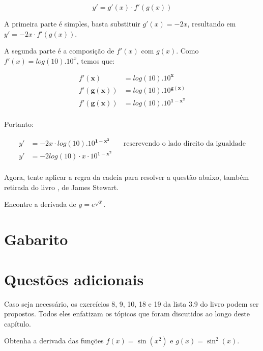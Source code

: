 \documentclass[main.tex]{subfiles}
\begin{document}
$$y' = g'(x) \cdot f'(g(x))$$

A primeira parte é simples, basta substituir $g'(x)=-2x$, resultando em $y' = -2x \cdot f'(g(x))$.

A segunda parte é a composição de $f'(x)$ com $g(x)$. Como $f'(x)=log(10) . 10^x$, temos que:

\begin{align*}
 f'(\mathbf{x}) &= log(10) . 10^\mathbf{x} \\
 f'(\mathbf{g(x)}) &= log(10) . 10^\mathbf{g(x)} \\
 f'(\mathbf{g(x)}) &= log(10) . 10^\mathbf{1-x^2} \\
\end{align*}

Portanto:

\begin{align*}
y' &= -2x \cdot log(10) . 10^\mathbf{1-x^2} && \text{rescrevendo o lado direito da igualdade} \\
y' &= -2log(10) \cdot x \cdot 10^\mathbf{1-x^2} \\
\end{align*}

Agora, tente aplicar a regra da cadeia para resolver a questão abaixo, também retirada do livro , de James Stewart.

\begin{resolva}
Encontre a derivada de $y=e^{\sqrt{x}}$.
\end{resolva}

\section{Gabarito}

\imprimeGabarito

\paraTutores

\section{Questões adicionais}

Caso seja necessário, os exercícios 8, 9, 10, 18 e 19 da lista 3.9 do livro  podem ser propostos. Todos eles enfatizam os tópicos que foram discutidos ao longo deste capítulo.

\begin{adicional}
Obtenha a derivada das funções $f(x)=\sin(x^2)$ e $g(x)=\sin^2(x)$.
\end{adicional}
\end{document}

